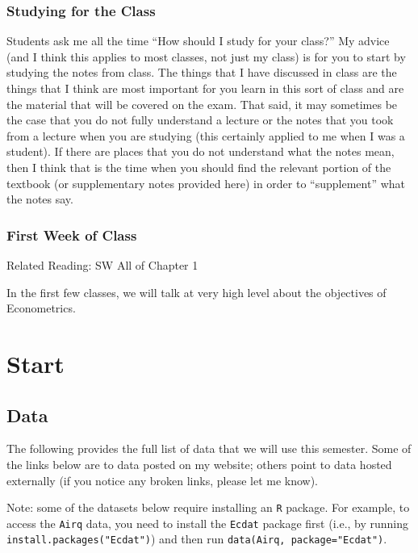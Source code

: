 \documentclass[
  letterpaper,
  DIV=11,
  numbers=noendperiod]{scrreprt}
\begin{document}
\section{Studying for the Class}\label{studying-for-the-class}

Students ask me all the time ``How should I study for your class?'' My
advice (and I think this applies to most classes, not just my class) is
for you to start by studying the notes from class. The things that I
have discussed in class are the things that I think are most important
for you learn in this sort of class and are the material that will be
covered on the exam. That said, it may sometimes be the case that you do
not fully understand a lecture or the notes that you took from a lecture
when you are studying (this certainly applied to me when I was a
student). If there are places that you do not understand what the notes
mean, then I think that is the time when you should find the relevant
portion of the textbook (or supplementary notes provided here) in order
to ``supplement'' what the notes say.

\section{First Week of Class}\label{first-week-of-class}

Related Reading: SW All of Chapter 1

In the first few classes, we will talk at very high level about the
objectives of Econometrics.

\part{Start}


\chapter{Data}\label{data}

The following provides the full list of data that we will use this
semester. Some of the links below are to data posted on my website;
others point to data hosted externally (if you notice any broken links,
please let me know).

Note: some of the datasets below require installing an \texttt{R}
package. For example, to access the \texttt{Airq} data, you need to
install the \texttt{Ecdat} package first (i.e., by running
\texttt{install.packages("Ecdat")}) and then run
\texttt{data(Airq,\ package="Ecdat")}.
\end{document}
